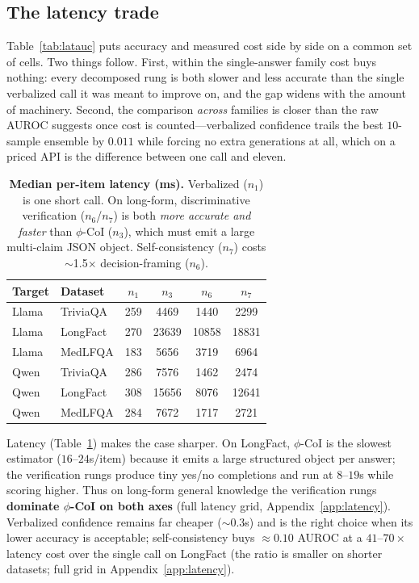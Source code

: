 \documentclass[11pt]{article}
\newcommand{\nverb}{$n_1$}     %
\newcommand{\nphi}{$n_3$}      %
\newcommand{\nyn}{$n_6$}       %
\newcommand{\nsc}{$n_7$}       %
\begin{document}
\subsection{The latency trade}
Table~\ref{tab:latauc} puts accuracy and measured cost side by side on a common set of cells.
Two things follow. First, within the single-answer family cost buys nothing: every decomposed
rung is both slower and less accurate than the single verbalized call it was meant to improve
on, and the gap widens with the amount of machinery. Second, the comparison \emph{across}
families is closer than the raw AUROC suggests once cost is counted---verbalized confidence
trails the best $10$-sample ensemble by $0.011$ while forcing no extra generations at all, which
on a priced API is the difference between one call and eleven.
\begin{table}[t]
\centering\small
\begin{tabular}{llcccc}
\toprule
Target & Dataset & \nverb & \nphi & \nyn & \nsc \\
\midrule
Llama & TriviaQA & 259 & 4469 & 1440 & 2299 \\
Llama & LongFact & 270 & 23639 & 10858 & 18831 \\
Llama & MedLFQA  & 183 & 5656 & 3719 & 6964 \\
\midrule
Qwen  & TriviaQA & 286 & 7576 & 1462 & 2474 \\
Qwen  & LongFact & 308 & 15656 & 8076 & 12641 \\
Qwen  & MedLFQA  & 284 & 7672 & 1717 & 2721 \\
\bottomrule
\end{tabular}
\caption{\textbf{Median per-item latency (ms).} Verbalized (\nverb) is one short call.
On long-form, discriminative verification (\nyn/\nsc) is both \emph{more accurate and
faster} than $\phi$-CoI (\nphi), which must emit a large multi-claim JSON object.
Self-consistency (\nsc) costs $\sim$1.5$\times$ decision-framing (\nyn).}
\label{tab:latency}
\end{table}
Latency (Table~\ref{tab:latency}) makes the case sharper. On LongFact, $\phi$-CoI is the
slowest estimator ($16$--$24$s/item) because it emits a large structured object per
answer; the verification rungs produce tiny yes/no completions and run at $8$--$19$s while
scoring higher. Thus on long-form general knowledge the verification rungs
\textbf{dominate $\phi$-CoI on both axes} (full latency grid, Appendix~\ref{app:latency}).
Verbalized confidence remains far cheaper
($\sim$0.3s) and is the right choice when its lower accuracy is acceptable; self-consistency
buys ${\approx}0.10$ AUROC at a $41$--$70\times$ latency cost over the single call on LongFact
(the ratio is smaller on shorter datasets; full grid in Appendix~\ref{app:latency}).
\end{document}
